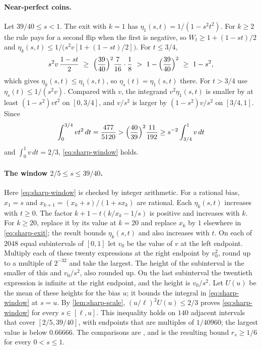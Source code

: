 \paragraph{Near-perfect coins.}
Let $39/40\le s<1$. The exit with $k=1$ has $\eta_1(s,t)=1/(1-s^2t^2)$. For
$k\ge2$ the rule pays for a second flip when the first is negative, so
$W_t\ge1+(1-st)/2$ and $\eta_k(s,t)\le1/\bigl(s^2v[1+(1-st)/2]\bigr)$. For
$t\le3/4$,
\[
 s^2v\,\frac{1-st}2\ \ge\ \Bigl(\frac{39}{40}\Bigr)^2\frac7{16}\cdot\frac18
 \ >\ 1-\Bigl(\frac{39}{40}\Bigr)^2\ \ge\ 1-s^2,
\]
which gives $\eta_k(s,t)\le \eta_1(s,t)$, so $\eta_s(t)=\eta_1(s,t)$ there. For
$t>3/4$ use $\eta_s(t)\le1/(s^2v)$. Compared with $v$, the integrand
$v^2\eta_1(s,t)$ is smaller by
at least $(1-s^2)vt^2$ on $[0,3/4]$, and $v/s^2$ is larger by
$(1-s^2)v/s^2$ on $[3/4,1]$. Since
\[
 \int_0^{3/4}vt^2\,dt=\frac{477}{5120}
 >\Bigl(\frac{40}{39}\Bigr)^2\frac{11}{192}
 \ge s^{-2}\int_{3/4}^1v\,dt
\]
and $\int_0^1v\,dt=2/3$, \eqref{eq:sharp-window} holds.

\paragraph{The window $2/5\le s\le39/40$.}
Here \eqref{eq:sharp-window} is checked by integer arithmetic. For a
rational bias, $x_1=s$ and $x_{k+1}=(x_k+s)/(1+sx_k)$ are rational. Each
$\eta_k(s,t)$ increases with $t\ge0$. The factor $k+1-t(k/x_k-1/s)$ is
positive and increases with $k$. For $k\ge20$, replace it by its value at
$k=20$ and replace $x_k$ by $1$ elsewhere in \eqref{eq:sharp-exit}; the
result bounds $\eta_k(s,t)$ and also increases with $t$. On each of $2048$
equal subintervals of $[0,1]$ let $v_0$ be the value of $v$ at the left
endpoint. Multiply each of these twenty expressions at the right endpoint
by $v_0^2$, round up to a multiple of $2^{-32}$ and take the largest. The
height of the subinterval is the smaller of this and $v_0/s^2$, also
rounded up. On the last subinterval the twentieth expression is infinite
at the right endpoint, and the height is $v_0/s^2$. Let $U(u)$ be the mean of these heights for the bias $u$; it
bounds the integral in \eqref{eq:sharp-window} at $s=u$. By
\cref{lem:sharp-scale}, $(u/\ell)^2U(u)\le2/3$ proves
\eqref{eq:sharp-window} for every $s\in[\ell,u]$. This inequality holds on $140$ adjacent intervals that
cover $[2/5,39/40]$, with endpoints that are multiples of $1/40960$; the
largest value is below $0.66666$. The comparisons are
, and
 is the
resulting bound $r_s\ge1/6$ for every $0<s\le1$.

